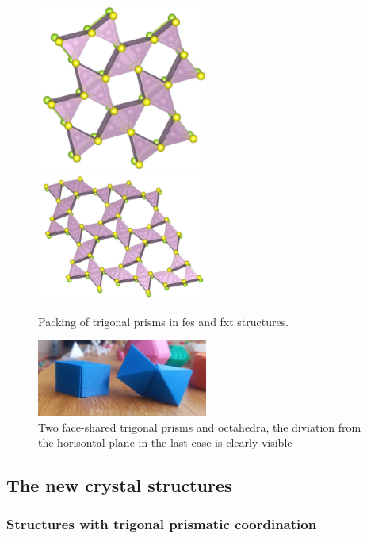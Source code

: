 \documentclass[a4paperm]{article}
\begin{document}
\begin{figure}[H] \centering
	\includegraphics[width=0.5\textwidth]{fes_SMoSe.jpg}
        \includegraphics[width=0.5\textwidth]{fxt_SMoSe.jpg}
	\caption{Packing of trigonal prisms in fes and fxt structures.}
\label{fes_fxt}
\end{figure}

\begin{figure}[H] \centering
	\includegraphics[width=0.5\textwidth]{2prism_oct.jpg}
	\caption{Two face-shared trigonal prisms and octahedra, the diviation from the horisontal plane in the last case is clearly visible}
\label{2prism_oct.jpg}
\end{figure}


		\subsection{The new crystal structures}


\subsubsection{Structures with trigonal prismatic coordination}
\end{document}
